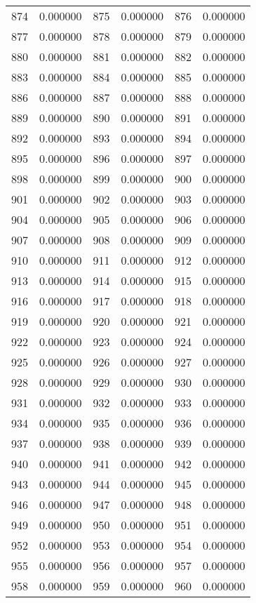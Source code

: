 \documentclass[12pt]{article}
\begin{document}
\begin{longtable}{@{}cc|cc|cc@{}}
874 & 0.000000 & 875 & 0.000000 & 876 & 0.000000 \\
877 & 0.000000 & 878 & 0.000000 & 879 & 0.000000 \\
880 & 0.000000 & 881 & 0.000000 & 882 & 0.000000 \\
883 & 0.000000 & 884 & 0.000000 & 885 & 0.000000 \\
886 & 0.000000 & 887 & 0.000000 & 888 & 0.000000 \\
889 & 0.000000 & 890 & 0.000000 & 891 & 0.000000 \\
892 & 0.000000 & 893 & 0.000000 & 894 & 0.000000 \\
895 & 0.000000 & 896 & 0.000000 & 897 & 0.000000 \\
898 & 0.000000 & 899 & 0.000000 & 900 & 0.000000 \\
901 & 0.000000 & 902 & 0.000000 & 903 & 0.000000 \\
904 & 0.000000 & 905 & 0.000000 & 906 & 0.000000 \\
907 & 0.000000 & 908 & 0.000000 & 909 & 0.000000 \\
910 & 0.000000 & 911 & 0.000000 & 912 & 0.000000 \\
913 & 0.000000 & 914 & 0.000000 & 915 & 0.000000 \\
916 & 0.000000 & 917 & 0.000000 & 918 & 0.000000 \\
919 & 0.000000 & 920 & 0.000000 & 921 & 0.000000 \\
922 & 0.000000 & 923 & 0.000000 & 924 & 0.000000 \\
925 & 0.000000 & 926 & 0.000000 & 927 & 0.000000 \\
928 & 0.000000 & 929 & 0.000000 & 930 & 0.000000 \\
931 & 0.000000 & 932 & 0.000000 & 933 & 0.000000 \\
934 & 0.000000 & 935 & 0.000000 & 936 & 0.000000 \\
937 & 0.000000 & 938 & 0.000000 & 939 & 0.000000 \\
940 & 0.000000 & 941 & 0.000000 & 942 & 0.000000 \\
943 & 0.000000 & 944 & 0.000000 & 945 & 0.000000 \\
946 & 0.000000 & 947 & 0.000000 & 948 & 0.000000 \\
949 & 0.000000 & 950 & 0.000000 & 951 & 0.000000 \\
952 & 0.000000 & 953 & 0.000000 & 954 & 0.000000 \\
955 & 0.000000 & 956 & 0.000000 & 957 & 0.000000 \\
958 & 0.000000 & 959 & 0.000000 & 960 & 0.000000 \\

\end{longtable}
\end{document}
